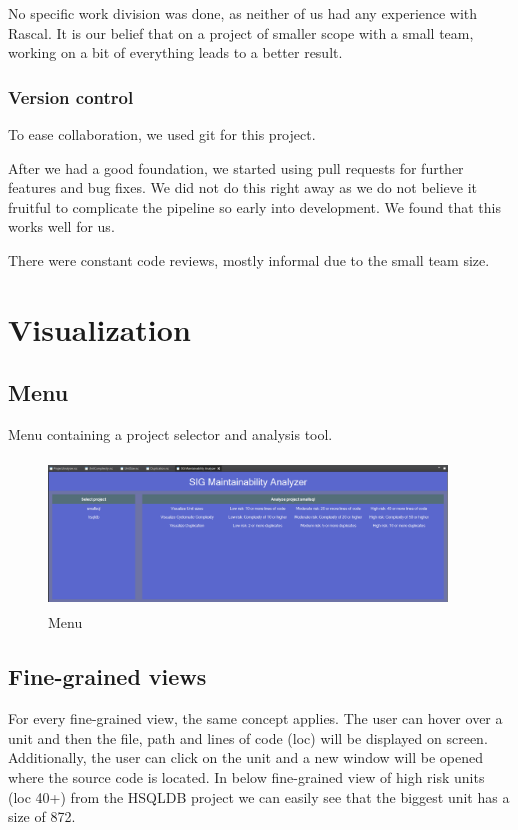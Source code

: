 \documentclass{article}
\begin{document}
No specific work division was done, as neither of us had any experience with Rascal. It is our belief that on a project of smaller scope with a small team, working on a bit of everything leads to a better result.

\subsubsection{Version control}
To ease collaboration, we used git for this project.

After we had a good foundation, we started using pull requests for further features and bug fixes. We did not do this right away as we do not believe it fruitful to complicate the pipeline so early into development. We found that this works well for us.

There were constant code reviews, mostly informal due to the small team size.




\clearpage
\appendix
\appendixpage{}

\section{Visualization}
\label{appendix:visualization}
\subsection{Menu}
Menu containing a project selector and analysis tool.
\begin{figure}[!htbp]
	\centering
	\label{fig:vis-menu}
	\caption{Menu}
	\includegraphics[width=400px, height=150px]{vis_menu.png}
\end{figure}

\subsection{Fine-grained views}
For every fine-grained view, the same concept applies. 
The user can hover over a unit and then the file, path and lines of code (loc) will be displayed on screen. 
Additionally, the user can click on the unit and a new window will be opened where the source code is located.
In below fine-grained view of high risk units (loc 40+) from the HSQLDB project we can easily see that the biggest unit has a size of 872. 
\end{document}
